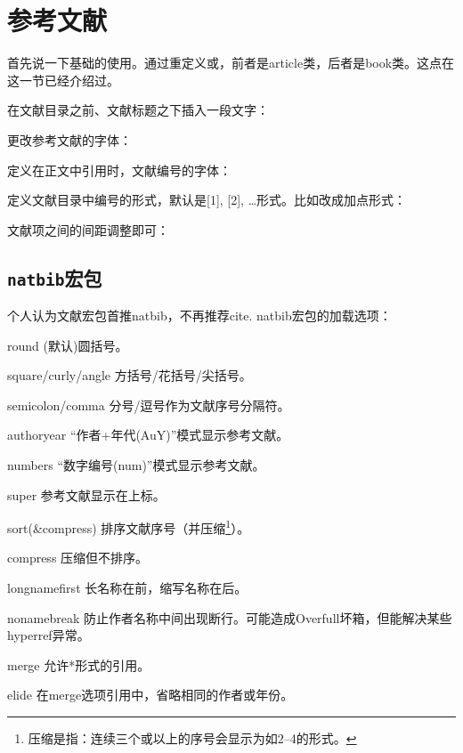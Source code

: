 \section{\bibtex 参考文献}
\label{sec:bibtex}

首先说一下基础的使用。通过重定义或\latexline{\\bibname}，前者是article类，后者是book类。这点在这一节已经介绍过。
\begin{latex}{}
\renewcommand{\bibname}{参考文献}
\end{latex}

在文献目录之前、文献标题之下插入一段文字：
\begin{latex}{}
\renewcommand{\bibpreamble}{以下是参考文献：}
\end{latex}

更改参考文献的字体：
\begin{latex}{}
\renewcommand{\bibfont}{\small}
\end{latex}

定义在正文中引用时，文献编号的字体：
\begin{latex}{}
\renewcommand{\citenumfont}{\itshape}
\end{latex}

定义文献目录中编号的形式，默认是[1], [2], \ldots 形式。比如改成加点形式：
\begin{latex}{}
\renewcommand{\bibnumfmt}[1]{\textbf{#1.}}
\end{latex}

文献项之间的间距调整\latexline{\\bibsep}即可：
\begin{latex}{}
\setlength{\bibsep}{1ex}
\end{latex}

\subsection{\texttt{natbib}宏包}
个人认为文献宏包首推natbib，不再推荐cite. natbib宏包的加载选项：
\begin{para}
\item[round] (默认)圆括号。
\item[square/curly/angle] 方括号/花括号/尖括号。
\item[semicolon/comma] 分号/逗号作为文献序号分隔符。
\item[authoryear] “作者+年代(AuY)”模式显示参考文献。
\item[numbers] “数字编号(num)”模式显示参考文献。
\item[super] 参考文献显示在上标。
\item[sort(\&compress)] 排序文献序号（并压缩\footnote{压缩是指：连续三个或以上的序号会显示为如2--4的形式。}）。
\item[compress] 压缩但不排序。
\item[longnamefirst] 长名称在前，缩写名称在后。
\item[nonamebreak] 防止作者名称中间出现断行。可能造成Overfull坏箱，但能解决某些hyperref异常。
\item[merge] 允许*形式的引用。
\item[elide] 在merge选项引用中，省略相同的作者或年份。
\end{para}

